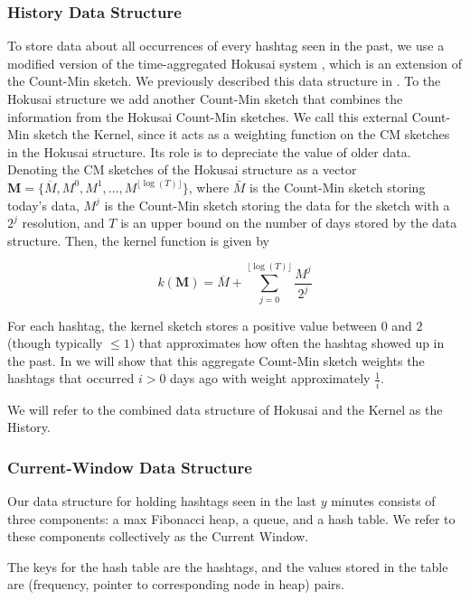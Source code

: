 \documentclass[twoside]{article}
\newcommand{\nref}[1]
 {\textbf{\nameref{#1}}}
\newcommand{\cc}[1]
 {\textbf{\cite{#1}}}
\begin{document}
\begin{multicols}{2}
\subsubsection{History Data Structure}

To store data about all occurrences of every hashtag seen in the past, we use a modified version of the time-aggregated Hokusai system \cc{Matusevych:2012}, which is an extension of the Count-Min sketch. We previously described this data structure in \nref{sec:PreviousWork}. 
To the Hokusai structure we add another Count-Min sketch that combines the information from the Hokusai Count-Min sketches. We call this external Count-Min sketch the Kernel, since it acts as a weighting function on the CM sketches in the Hokusai structure. Its role is to depreciate the value of older data.
Denoting the CM sketches of the Hokusai structure as a vector $\textbf{M} = \{\overline{M}, M^0, M^1, ..., M^{{\lfloor {\log(T)} \rfloor}}\}$, where $\bar{M}$ is the Count-Min sketch storing today's data, $M^j$ is the Count-Min sketch storing the data for the sketch with a $2^j$ resolution, and $T$ is an upper bound on the number of days stored by the data structure. Then, the kernel function is given by

\begin{equation} 
\label{eq:kernel}
\textit{k}(\textbf{M}) = \overline{M} + \sum\limits_{j=0}^{{\lfloor \log⁡(T) \rfloor}} \frac{M^j}{2^j}
\end{equation}

For each hashtag, the kernel sketch stores a positive value between $0$ and $2$ (though typically $\leq 1$) that approximates how often the hashtag showed up in the past. In \nref{sec:Correctness} we will show that this aggregate Count-Min sketch weights the hashtags that occurred $i > 0$ days ago with weight approximately $\frac{1}{i}$.

We will refer to the combined data structure of Hokusai and the Kernel as the History.

\subsubsection{Current-Window Data Structure}

Our data structure for holding hashtags seen in the last $y$ minutes consists of three components: a max Fibonacci heap, a queue, and a hash table.  We refer to these components collectively as the Current Window.

The keys for the hash table are the hashtags, and the values stored in the table are (frequency, pointer to corresponding node in heap) pairs.


\end{multicols}
\end{document}
